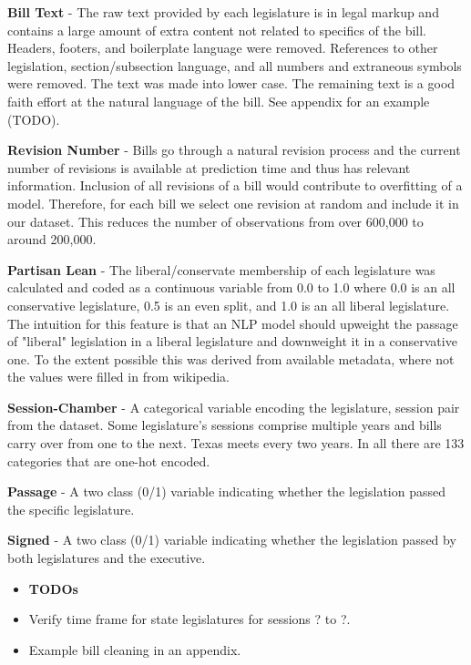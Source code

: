 \documentclass[11pt]{article}
\begin{document}
\textbf{Bill Text} - The raw text provided by each legislature is in legal markup and contains a large amount of extra content not related to specifics of the bill. 
Headers, footers, and boilerplate language were removed. References to other legislation, section/subsection language, and all numbers and extraneous symbols were removed.
The text was made into lower case. The remaining text is a good faith effort at the natural language of the bill. See appendix for an example (TODO).

\textbf{Revision Number} - Bills go through a natural revision process and the current number of revisions is available at prediction time and thus has relevant information. 
Inclusion of all revisions of a bill would contribute to overfitting of a model. Therefore, for each bill we select one revision at random and include it in our dataset.
This reduces the number of observations from over 600,000 to around 200,000.

\textbf{Partisan Lean} - The liberal/conservate membership of each legislature was calculated and coded as a continuous variable from 0.0 to 1.0
 where 0.0 is an all conservative legislature, 0.5 is an even split, and 1.0 is an all liberal legislature. The intuition for this feature is that an 
 NLP model should upweight the passage of "liberal" legislation in a liberal legislature and downweight it in a conservative one. To the extent possible this was
 derived from available metadata, where not the values were filled in from wikipedia.

\textbf{Session-Chamber} - A categorical variable encoding the legislature, session pair from the dataset. Some legislature's sessions comprise multiple years and bills
carry over from one to the next. Texas meets every two years. In all there are 133 categories that are one-hot encoded.

\textbf{Passage} - A two class (0/1) variable indicating whether the legislation passed the specific legislature. 

\textbf{Signed} - A two class (0/1) variable indicating whether the legislation passed by both legislatures and the executive.


\begin{itemize}
  \item \textbf{TODOs}
  \item Verify time frame for state legislatures for sessions ? to ?.
  \item Example bill cleaning in an appendix.

\end{itemize}
\end{document}
